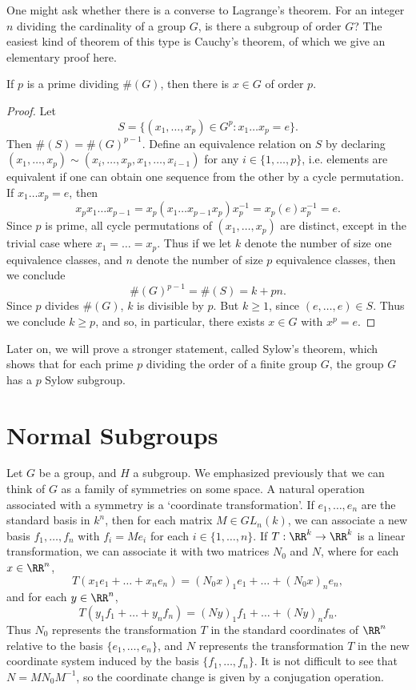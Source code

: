 One might ask whether there is a converse to Lagrange's theorem. For an integer $n$ dividing the cardinality of a group $G$, is there a subgroup of order $G$? The easiest kind of theorem of this type is Cauchy's theorem, of which we give an elementary proof here.

\begin{theorem}
    If $p$ is a prime dividing $\#(G)$, then there is $x \in G$ of order $p$.
\end{theorem}
\begin{proof}
    Let
    \[ S = \{ (x_1, \dots, x_p) \in G^p : x_1 \dots x_p = e \}. \]
    Then $\#(S) = \#(G)^{p-1}$. Define an equivalence relation on $S$ by declaring $(x_1, \dots, x_p) \sim (x_i, \dots, x_p, x_1, \dots, x_{i-1})$ for any $i \in \{ 1, \dots, p \}$, i.e. elements are equivalent if one can obtain one sequence from the other by a cycle permutation. If $x_1 \dots x_p = e$, then
    \[ x_p x_1 \dots x_{p-1} = x_p (x_1 \dots x_{p-1} x_p) x_p^{-1} = x_p (e) x_p^{-1} = e. \]
    Since $p$ is prime, all cycle permutations of $(x_1, \dots, x_p)$ are distinct, except in the trivial case where $x_1 = \dots = x_p$. Thus if we let $k$ denote the number of size one equivalence classes, and $n$ denote the number of size $p$ equivalence classes, then we conclude
    \[ \#(G)^{p-1} = \#(S) = k + pn. \]
    Since $p$ divides $\#(G)$, $k$ is divisible by $p$. But $k \geq 1$, since $(e,\dots,e) \in S$. Thus we conclude $k \geq p$, and so, in particular, there exists $x \in G$ with $x^p = e$.
\end{proof}

Later on, we will prove a stronger statement, called Sylow's theorem, which shows that for each prime $p$ dividing the order of a finite group $G$, the group $G$ has a $p$ Sylow subgroup.

\section{Normal Subgroups}

Let $G$ be a group, and $H$ a subgroup. We emphasized previously that we can think of $G$ as a family of symmetries on some space. A natural operation associated with a symmetry is a `coordinate transformation'. If $e_1, \dots, e_n$ are the standard basis in $k^n$, then for each matrix $M \in GL_n(k)$, we can associate a new basis $f_1, \dots, f_n$ with $f_i = M e_i$ for each $i \in \{ 1, \dots, n \}$. If $T: \RR^k \to \RR^k$ is a linear transformation, we can associate it with two matrices $N_0$ and $N$, where for each $x \in \RR^n$,
%
\[ T(x_1e_1 + \dots + x_ne_n) = (N_0 x)_1 e_1 + \dots + (N_0 x)_n e_n, \]
%
and for each $y \in \RR^n$,
%
\[ T(y_1f_1 + \dots + y_nf_n) = (N y)_1 f_1 + \dots + (N y)_n f_n. \]
%
Thus $N_0$ represents the transformation $T$ in the standard coordinates of $\RR^n$ relative to the basis $\{ e_1, \dots, e_n \}$, and $N$ represents the transformation $T$ in the new coordinate system induced by the basis $\{ f_1, \dots, f_n \}$. It is not difficult to see that $N = M N_0 M^{-1}$, so the coordinate change is given by a conjugation operation.

